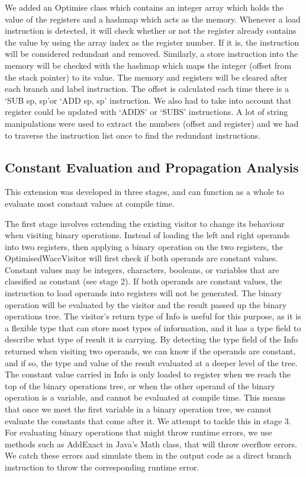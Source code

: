 \documentclass[11pt]{article}
\begin{document}
We added an Optimise class which contains an integer array which holds the value of the registers and a hashmap which acts as the memory. Whenever a load instruction is detected, it will check whether or not the register already contains the value by using the array index as the register number. If it is, the instruction will be considered redundant and removed. Similarly, a store instruction into the memory will be checked with the hashmap which maps the integer (offset from the stack pointer) to its value. The memory and registers will be cleared after each branch and label instruction. The offset is calculated each time there is a `SUB sp, sp'or `ADD sp, sp' instruction. We also had to take into account that register could be updated with `ADDS' or `SUBS' instructions. A lot of string manipulations were used to extract the numbers (offset and register) and we had to traverse the instruction list once to find the redundant instructions. 

\subsection{Constant Evaluation and Propagation Analysis}

This extension was developed in three stages, and can function as a whole to evaluate most constant values at compile time.

\medskip

The first stage involves extending the existing visitor to change its behaviour when visiting binary operations. Instead of loading the left and right operands into two registers, then applying a binary operation on the two registers, the OptimisedWaccVisitor will first check if both operands are constant values. Constant values may be integers, characters, booleans, or variables that are classified as constant (see stage 2). If both operands are constant values, the instruction to load operands into registers will not be generated. The binary operation will be evaluated by the visitor and the result passed up the binary operations tree. The visitor's return type of Info is useful for this purpose, as it is a flexible type that can store most types of information, and it has a type field to describe what type of result it is carrying. By detecting the type field of the Info returned when visiting two operands, we can know if the operands are constant, and if so, the type and value of the result evaluated at a deeper level of the tree. The constant value carried in Info is only loaded to register when we reach the top of the binary operations tree, or when the other operand of the binary operation is a variable, and cannot be evaluated at compile time. This means that once we meet the first variable in a binary operation tree, we cannot evaluate the constants that come after it. We attempt to tackle this in stage 3. For evaluating binary operations that might throw runtime errors, we use methods such as AddExact in Java's Math class, that will throw overflow errors. We catch these errors and simulate them in the output code as a direct branch instruction to throw the corresponding runtime error.
\end{document}
